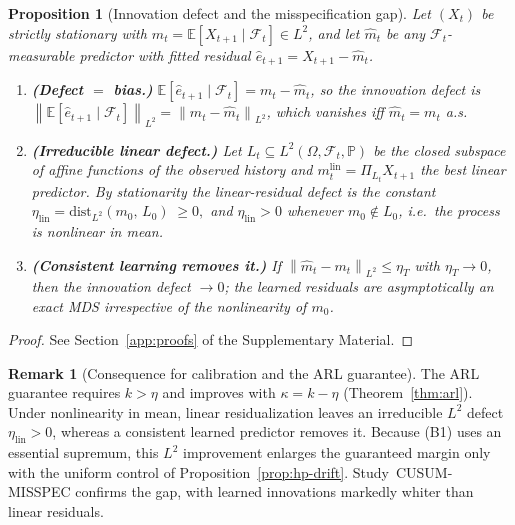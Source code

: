 \documentclass[bj,authoryear]{imsart}
\theoremstyle{plain}
\newtheorem{proposition}[theorem]{Proposition}
\theoremstyle{definition}
\newtheorem{remark}{Remark}[section]
\newcommand{\E}{\mathbb{E}}
\newcommand{\Prob}{\mathbb{P}}
\newcommand{\F}{\mathcal{F}}
\newcommand{\norm}[1]{\left\lVert #1 \right\rVert}
\newcommand{\given}{\mid}
\begin{document}
\begin{proposition}[Innovation defect and the misspecification gap]
\label{prop:whiteness}
  Let $(X_t)$ be strictly stationary with $m_t=\E[X_{t+1}\given\F_t]\in L^2$,
  and let $\hat m_t$ be any $\F_t$-measurable predictor with fitted residual
  $\hat e_{t+1}=X_{t+1}-\hat m_t$.
  \begin{enumerate}[label=(\roman*), itemsep=3pt]
    \item \textbf{(Defect $=$ bias.)}
      $\E[\hat e_{t+1}\given\F_t]=m_t-\hat m_t$, so the innovation defect is
      $\norm{\E[\hat e_{t+1}\given\F_t]}_{L^2}=\norm{m_t-\hat m_t}_{L^2}$,
      which vanishes iff $\hat m_t=m_t$ a.s.
    \item \textbf{(Irreducible linear defect.)}
      Let $L_t\subseteq L^2(\Omega,\F_t,\Prob)$ be the closed subspace of
      affine functions of the observed history and
      $m_t^{\mathrm{lin}}=\Pi_{L_t}X_{t+1}$ the best linear predictor.  By
      stationarity the linear-residual defect is the constant
      \(
        \eta_{\mathrm{lin}}
        =\mathrm{dist}_{L^2}(m_0,\,L_0)\;\ge 0,
      \)
      and $\eta_{\mathrm{lin}}>0$ whenever $m_0\notin L_0$, i.e.\ the process
      is nonlinear in mean.
    \item \textbf{(Consistent learning removes it.)}
      If $\norm{\hat m_t-m_t}_{L^2}\leq\eta_T$ with $\eta_T\to0$, then the
      innovation defect $\to0$; the learned residuals are asymptotically an
      exact MDS irrespective of the nonlinearity of $m_0$.
  \end{enumerate}
\end{proposition}

\begin{proof}
  See Section~\ref{app:proofs} of the Supplementary Material.
\end{proof}

\begin{remark}[Consequence for calibration and the ARL guarantee]
\label{rem:whiteness-arl}
The ARL guarantee requires $k>\eta$ and improves with
$\kappa=k-\eta$ (Theorem~\ref{thm:arl}).  Under nonlinearity in mean,
linear residualization leaves an irreducible $L^2$ defect
$\eta_{\mathrm{lin}}>0$, whereas a consistent learned predictor removes it.
Because (B1) uses an essential supremum, this $L^2$ improvement enlarges the
guaranteed margin only with the uniform control of
Proposition~\ref{prop:hp-drift}.  Study~CUSUM-MISSPEC confirms the gap,
with learned innovations markedly whiter than linear residuals.
\end{remark}
\end{document}
